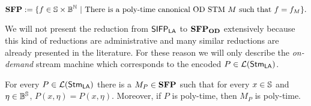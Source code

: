\begin{defn}[$\SFPOD$]
  \label{def:sfpod}
  \small
  \[
  \mathbf{SFP} := \{ f \in \mathbb{S} \times \mathbb{B}^{\mathbb{N}}~|~ \text{There is a poly-time canonical OD STM $M$ such that }f=f_M\}.
  \]
  \normalsize
\end{defn}


We will not present the reduction from $\mathsf{SIFP_{{\mathsf{LA}}}}$ to $\SFPOD$ extensively
because this kind of reductions are administrative
and many similar reductions are already presented in the literature.
%
For these reason we will only describe the \emph{on-demand} stream machine
which corresponds to the encoded $P \in {\mathcal L ({\mathsf{Stm}_{\mathsf{LA}}})}$.

\begin{prop}
  \label{prop:SFPODimplSIFPLA}
  For every $P \in {\mathcal L ({\mathsf{Stm}_{\mathsf{LA}}})}$ there is a $M_P \in \mathbf{SFP}$ such that
  for every $x \in \mathbb{S}$ and $\eta \in \mathbb{B}^{\mathbb{S}}$, $P(x, \eta)=P(x, \eta)$.
  Moreover, if $P$ is poly-time, then $M_P$ is poly-time.
\end{prop}
